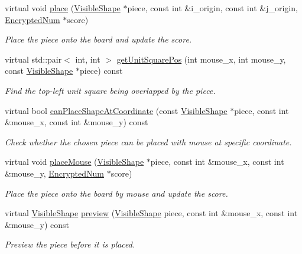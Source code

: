 \begin{DoxyCompactItemize}
virtual void \mbox{\hyperlink{class_board_a759fee79a5c0da27101adc909c352b62}{place}} (\mbox{\hyperlink{class_visible_shape}{Visible\+Shape}} $\ast$piece, const int \&i\+\_\+origin, const int \&j\+\_\+origin, \mbox{\hyperlink{class_encrypted_num}{Encrypted\+Num}} $\ast$score)
\begin{DoxyCompactList}\small\item\em Place the piece onto the board and update the score. \end{DoxyCompactList}\item 
virtual std\+::pair$<$ int, int $>$ \mbox{\hyperlink{class_board_a47fb67404ee45b4ad700a57e3849995b}{get\+Unit\+Square\+Pos}} (int mouse\+\_\+x, int mouse\+\_\+y, const \mbox{\hyperlink{class_visible_shape}{Visible\+Shape}} $\ast$piece) const
\begin{DoxyCompactList}\small\item\em Find the top-\/left unit square being overlapped by the piece. \end{DoxyCompactList}\item 
virtual bool \mbox{\hyperlink{class_board_aa4001c8b1e2338fa0dfed7df6f5dcb6b}{can\+Place\+Shape\+At\+Coordinate}} (const \mbox{\hyperlink{class_visible_shape}{Visible\+Shape}} $\ast$piece, const int \&mouse\+\_\+x, const int \&mouse\+\_\+y) const
\begin{DoxyCompactList}\small\item\em Check whether the chosen piece can be placed with mouse at specific coordinate. \end{DoxyCompactList}\item 
virtual void \mbox{\hyperlink{class_board_a6403c0a5182a07188fd0011748f27e9c}{place\+Mouse}} (\mbox{\hyperlink{class_visible_shape}{Visible\+Shape}} $\ast$piece, const int \&mouse\+\_\+x, const int \&mouse\+\_\+y, \mbox{\hyperlink{class_encrypted_num}{Encrypted\+Num}} $\ast$score)
\begin{DoxyCompactList}\small\item\em Place the piece onto the board by mouse and update the score. \end{DoxyCompactList}\item 
virtual \mbox{\hyperlink{class_visible_shape}{Visible\+Shape}} \mbox{\hyperlink{class_board_adb77e0ffe02e8402d3e14367141830a5}{preview}} (\mbox{\hyperlink{class_visible_shape}{Visible\+Shape}} piece, const int \&mouse\+\_\+x, const int \&mouse\+\_\+y) const
\begin{DoxyCompactList}\small\item\em Preview the piece before it is placed. \end{DoxyCompactList}\item 

\end{DoxyCompactItemize}
